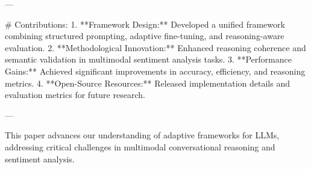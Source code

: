 ---

# Contributions:
1. **Framework Design:** Developed a unified framework combining structured prompting, adaptive fine-tuning, and reasoning-aware evaluation.
2. **Methodological Innovation:** Enhanced reasoning coherence and semantic validation in multimodal sentiment analysis tasks.
3. **Performance Gains:** Achieved significant improvements in accuracy, efficiency, and reasoning metrics.
4. **Open-Source Resources:** Released implementation details and evaluation metrics for future research.

---

This paper advances our understanding of adaptive frameworks for LLMs, addressing critical challenges in multimodal conversational reasoning and sentiment analysis.
